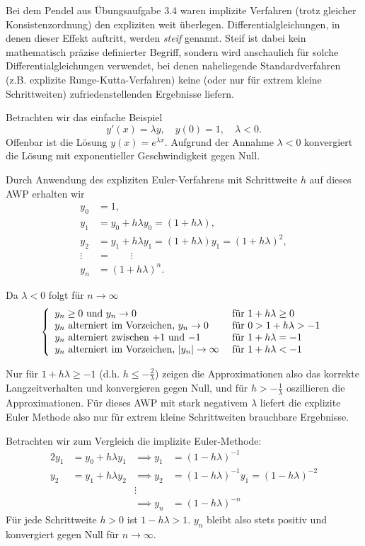 \documentclass[
]{mycourse}
\theoremstyle{mythm}
\theoremstyle{break}
\begin{document}
Bei dem Pendel aus Übungsaufgabe 3.4 waren implizite Verfahren (trotz gleicher Konsistenzordnung) den expliziten weit überlegen. 
Differentialgleichungen, in denen dieser Effekt auftritt, werden \emph{steif} genannt. Steif ist dabei kein mathematisch präzise definierter Begriff, sondern wird anschaulich für solche Differentialgleichungen verwendet, bei denen naheliegende Standardverfahren (z.B. explizite Runge-Kutta-Verfahren) keine (oder nur für extrem kleine Schrittweiten) zufriedenstellenden Ergebnisse liefern. 

Betrachten wir das einfache Beispiel 
\[
y'(x)=\lambda y,\quad y(0)=1, \quad \lambda<0.
\]
Offenbar ist die Lösung $y(x)=e^{\lambda x}$. Aufgrund der Annahme $\lambda<0$ konvergiert die
Lösung mit exponentieller Geschwindigkeit gegen Null.

Durch Anwendung des expliziten Euler-Verfahrens mit Schrittweite $h$ auf dieses AWP erhalten wir
\begin{align*}
	y_0 &= 1,\\
y_1 &= y_0 + h \lambda y_0=(1+h\lambda),\\
y_2 &= y_1 + h \lambda y_1=(1+h\lambda)y_1=(1+h\lambda)^2,\\
\vdots \; &= \qquad \vdots\\
y_n&= (1+h\lambda)^n.
\end{align*}

Da $\lambda<0$ folgt für $n\to \infty$ 
\[
\left\{ \begin{array}{l l} \mbox{$y_n\ge 0$ und $y_n\to 0$} & \mbox{ für $1+h\lambda \geq 0$}\\
\mbox{$y_n$ alterniert im Vorzeichen, $y_n\to 0$} & \mbox{ für $0>1+h\lambda>-1$}\\
\mbox{$y_n$ alterniert zwischen $+1$ und $-1$} & \mbox{ für $1+h\lambda=-1$}\\
\mbox{$y_n$ alterniert im Vorzeichen, $|y_n|\to \infty$} & \mbox{ für $1+h\lambda<-1$}
\end{array}\right.
\] 

Nur für $1+h\lambda \geq -1$ (d.h. $h\leq -\frac 2\lambda$) zeigen die Approximationen also das korrekte Langzeitverhalten und 
konvergieren gegen Null, und für $h> -\frac 1\lambda$ oszillieren die Approximationen.
Für dieses AWP mit stark negativem $\lambda$ liefert die explizite Euler Methode also nur
für extrem kleine Schrittweiten brauchbare Ergebnisse.

Betrachten wir zum Vergleich die implizite Euler-Methode:
\begin{alignat*}{2}
y_1 &= y_0 + h \lambda y_1 &\implies y_1&= (1-h\lambda)^{-1}\\
y_2 &= y_1 + h \lambda y_2 &\implies y_2&= (1-h\lambda)^{-1} y_1= (1-h\lambda)^{-2}\\ 
&&\vdots \qquad & \\
&&\implies y_n&=  (1-h\lambda)^{-n}
\end{alignat*}
Für jede Schrittweite $h>0$ ist $1-h\lambda>1$. $y_n$ bleibt also stets positiv und konvergiert gegen Null für $n\to \infty$.
\end{document}
